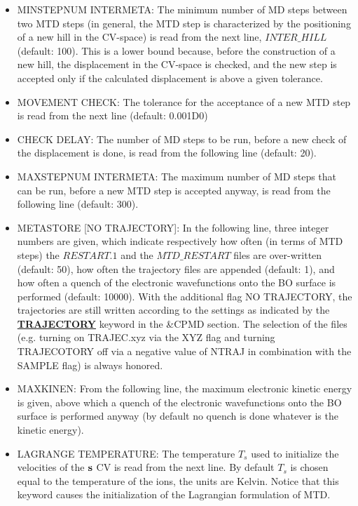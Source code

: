 \documentclass[twoside,10pt,titlepage,a4paper]{article}
\newcommand{\referto}[2]{\hyperlink{#1}{#2}}
\newcommand{\referto}[2]{\htmlref{#2}{#1}}
\newcommand{\refkeyword}[1]{%
\referto{#1}{\textbf{#1}}%
\index{#1}%
}%
\begin{document}
\begin{itemize}
\item{MINSTEPNUM INTERMETA:} The minimum number of MD steps between two
MTD steps (in general, the MTD step is characterized by the positioning
of a new hill in the CV-space) is read from the next line,
$INTER\_HILL$ (default: 100). This is a lower bound because,
before the construction of a new hill, the displacement in the
CV-space is checked, and the new step is accepted only if the
calculated displacement is above a given tolerance.

\item{MOVEMENT CHECK:} The tolerance for the acceptance of a
new MTD step is read from the next line (default:  0.001D0)

\item{CHECK DELAY:} The number of MD steps to be run, before a
new check of the displacement is done, is read from the following line (default: 20).

\item{MAXSTEPNUM INTERMETA:} The maximum number of MD steps that can be run,
before a new MTD step is accepted anyway, is read from the following line (default: 300).

\item{METASTORE [NO TRAJECTORY]:}
In the following line, three integer numbers are given,
which indicate respectively how often (in terms of MTD steps)
the $RESTART.1$ and the $MTD\_RESTART$ files are over-written (default: 50),
how often the trajectory files are appended (default: 1),
and how often a quench of the electronic wavefunctions onto the
BO surface is performed (default: 10000).
With the additional flag NO TRAJECTORY, the trajectories are
still written according to the settings as indicated by the
\refkeyword{TRAJECTORY} keyword in the \&CPMD section. The selection
of the files (e.g. turning on TRAJEC.xyz via the XYZ flag and turning
TRAJECOTORY off via a negative value of NTRAJ in combination with
the SAMPLE flag) is always honored.

\item{MAXKINEN:} From the following line, the maximum electronic
kinetic energy is given, above which a quench of the
electronic wavefunctions onto the BO surface is performed
anyway (by default no quench is done whatever is the kinetic energy).

\item{LAGRANGE TEMPERATURE:} The temperature $T_s$ used to initialize
the velocities of the ${\bf s}$ CV is read from the next line.
By default $T_s$ is chosen equal to the temperature of the ions,
the units are Kelvin. Notice that this keyword causes the
initialization of the Lagrangian formulation of MTD.


\end{itemize}
\end{document}
